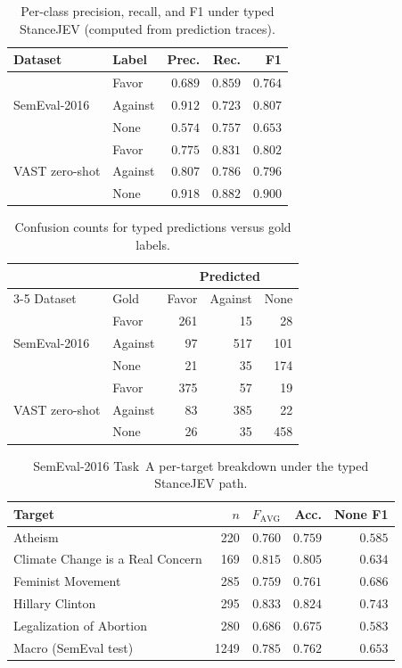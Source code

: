 \documentclass[10pt]{article}
\theoremstyle{definition}
\begin{document}
\begin{table}[H]
\centering
\small
\begin{tabular}{llrrr}
\toprule
Dataset & Label & Prec. & Rec. & F1 \\
\midrule
\multirow{3}{*}{SemEval-2016}
 & Favor & $0.689$ & $0.859$ & $0.764$ \\
 & Against & $0.912$ & $0.723$ & $0.807$ \\
 & None & $0.574$ & $0.757$ & $0.653$ \\
\midrule
\multirow{3}{*}{VAST zero-shot}
 & Favor & $0.775$ & $0.831$ & $0.802$ \\
 & Against & $0.807$ & $0.786$ & $0.796$ \\
 & None & $0.918$ & $0.882$ & $0.900$ \\
\bottomrule
\end{tabular}
\caption{Per-class precision, recall, and F1 under typed StanceJEV (computed from prediction traces).}
\label{tab:perclass}
\end{table}

\begin{table}[H]
\centering
\small
\begin{tabular}{llrrr}
\toprule
& & \multicolumn{3}{c}{Predicted} \\
\cmidrule(lr){3-5}
Dataset & Gold & Favor & Against & None \\
\midrule
\multirow{3}{*}{SemEval-2016}
 & Favor & 261 & 15 & 28 \\
 & Against & 97 & 517 & 101 \\
 & None & 21 & 35 & 174 \\
\midrule
\multirow{3}{*}{VAST zero-shot}
 & Favor & 375 & 57 & 19 \\
 & Against & 83 & 385 & 22 \\
 & None & 26 & 35 & 458 \\
\bottomrule
\end{tabular}
\caption{Confusion counts for typed predictions versus gold labels.}
\label{tab:confusion}
\end{table}

\begin{table}[H]
\centering
\small
\begin{tabular}{lrrrr}
\toprule
Target & $n$ & $F_{\mathrm{AVG}}$ & Acc. & None F1 \\
\midrule
Atheism & 220 & $0.760$ & $0.759$ & $0.585$ \\
Climate Change is a Real Concern & 169 & $0.815$ & $0.805$ & $0.634$ \\
Feminist Movement & 285 & $0.759$ & $0.761$ & $0.686$ \\
Hillary Clinton & 295 & $0.833$ & $0.824$ & $0.743$ \\
Legalization of Abortion & 280 & $0.686$ & $0.675$ & $0.583$ \\
\midrule
Macro (SemEval test) & 1249 & $0.785$ & $0.762$ & $0.653$ \\
\bottomrule
\end{tabular}
\caption{SemEval-2016 Task~A per-target breakdown under the typed StanceJEV path.}
\label{tab:sem16-target}
\end{table}
\end{document}
